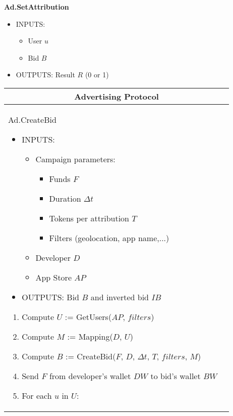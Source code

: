 \textbf{Ad.SetAttribution}
\vspace{-0.35cm}
\begin{itemize}
	\item INPUTS:
	\vspace{-0.35cm}
	\begin{itemize}
		\item User $u$
		\item Bid $B$
	\end{itemize}
	\item OUTPUTS: Result $R$ (0 or 1)
\end{itemize}

\begin{table}[h]
\scriptsize
\centering
\begin{tabular}{|p{}p{}|}
\hline
\multicolumn{2}{|c|}{Advertising Protocol} \\
\hline \vspace{0.1cm}
\textsf{Ad.CreateBid}
\begin{itemize}
	\vspace{-0.3cm}
	\item INPUTS:
	\vspace{-0.4cm}
	\begin{itemize}
		\item Campaign parameters:
		\begin{itemize}
			\item Funds $F$
			\item Duration $\Delta t$
			\item Tokens per attribution $T$
			\item Filters (geolocation, app name,...)
		\end{itemize}
		\item Developer $D$
		\item App Store $AP$
	\end{itemize}
	\item OUTPUTS: Bid $B$ and inverted bid $IB$
\end{itemize}
\begin{enumerate}
	\item Compute $U$ := \textsf{GetUsers}($AP$, $filters$)
	\item Compute $M$ := \textsf{Mapping}($D$, $U$)
	\item Compute $B$ := \textsf{CreateBid}($F$, $D$, $\Delta t$, $T$, $filters$, $M$)
	\item Send $F$ from developer's wallet $DW$ to bid's wallet $BW$
	\item For each $u$ in $U$:

\end{enumerate}
\end{tabular}
\end{table}
